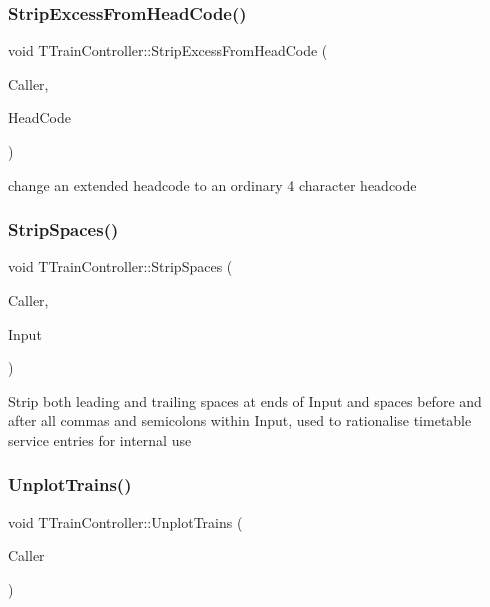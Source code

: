 \subsubsection{\texorpdfstring{Strip\+Excess\+From\+Head\+Code()}{StripExcessFromHeadCode()}}
{\footnotesize\ttfamily void T\+Train\+Controller\+::\+Strip\+Excess\+From\+Head\+Code (\begin{DoxyParamCaption}\item[{int}]{Caller,  }\item[{Ansi\+String \&}]{Head\+Code }\end{DoxyParamCaption})}

change an extended headcode to an ordinary 4 character headcode \mbox{\label{class_t_train_controller_ab0481dd8db0f3f99811f2cdc5b5dfd32}} 
\subsubsection{\texorpdfstring{Strip\+Spaces()}{StripSpaces()}}
{\footnotesize\ttfamily void T\+Train\+Controller\+::\+Strip\+Spaces (\begin{DoxyParamCaption}\item[{int}]{Caller,  }\item[{Ansi\+String \&}]{Input }\end{DoxyParamCaption})}

Strip both leading and trailing spaces at ends of Input and spaces before and after all commas and semicolons within Input, used to rationalise timetable service entries for internal use \mbox{\label{class_t_train_controller_a7e2abfcc38e51933883d959c4155aca0}} 
\subsubsection{\texorpdfstring{Unplot\+Trains()}{UnplotTrains()}}
{\footnotesize\ttfamily void T\+Train\+Controller\+::\+Unplot\+Trains (\begin{DoxyParamCaption}\item[{int}]{Caller }\end{DoxyParamCaption})}


